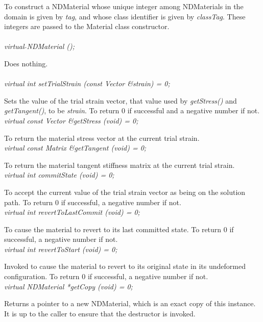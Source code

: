 To construct a NDMaterial whose unique integer among
NDMaterials in the domain is given by {\em tag}, and whose class
identifier is given by {\em classTag}. These integers are passed to
the Material class constructor. \\

 \\
{\em virtual $\tilde{ }$NDMaterial ();} 

Does nothing. \\ 

 \\
{\em virtual int setTrialStrain (const Vector \&strain) = 0; }  

Sets the value of the trial strain vector, that value used by {\em
getStress()} and {\em getTangent()}, to be {\em strain}. To return $0$
if successful and a negative number if not. \\

{\em virtual const Vector \&getStress (void) = 0; } 

To return the material stress vector at the current trial strain. \\

{\em virtual const Matrix \&getTangent (void) = 0; } 

To return the material tangent stiffness matrix at the current trial
strain. \\

{\em virtual int commitState (void) = 0; } 

To accept the current value of the trial strain vector as being on the
solution path. To return $0$ if successful, a negative number if not. \\

{\em virtual int revertToLastCommit (void) = 0; } 

To cause the material to revert to its last committed state. To
return $0$ if successful, a negative number if not. \\

{\em virtual int revertToStart (void) = 0; } 

Invoked to cause the material to revert to its original state in its
undeformed configuration. To return $0$ if successful, a negative
number if not. \\

{\em virtual NDMaterial *getCopy (void) = 0; } 

Returns a pointer to a new NDMaterial,
which is an exact copy of this instance. It is up to the caller to
ensure that the destructor is invoked. \\